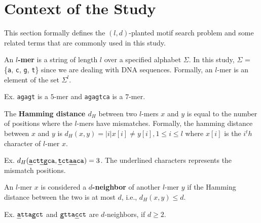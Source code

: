 \section{Context of the Study}

This section formally defines the $(l, d)$-planted motif search problem and some related terms that are commonly used in this study. \newline

 \newline
\noindent An \textbf{\boldmath $l$-mer} is a string of length $l$ over a specified alphabet $\Sigma$. In this study, $\Sigma$ = \{\texttt{a}, \texttt{c}, \texttt{g}, \texttt{t}\} since we are dealing with DNA sequences. Formally, an $l$-mer is an element of the set $\Sigma^l$. 

\noindent \hspace*{35pt} Ex. \texttt{agagt} is a $5$-mer and \texttt{agagtca} is a $7$-mer.  \newline

 \newline
\noindent The \textbf{\boldmath Hamming distance $d_H$} between two $l$-mers $x$ and $y$ is equal to the number of positions where the $l$-mers have mismatches. Formally, the hamming distance between $x$ and $y$ is $d_H(x, y) = |{i | x[i] \neq y[i], 1 \leq i \leq l}$ where $x[i]$ is the $i^th$ character of $l$-mer $x$.

\noindent \hspace*{35pt} Ex. $d_H(\texttt{\uline{a}ct\uline{tg}ca}, \texttt{\uline{t}ct\uline{aa}ca}) = 3$.\newline
\noindent \hspace*{55pt} The underlined characters represents the mismatch positions. \newline

 \newline
\noindent An $l$-mer $x$ is considered a \textbf{\boldmath $d$-neighbor} of another $l$-mer $y$ if the Hamming distance between the two is at most $d$, i.e., $d_H(x, y) \leq d$.

\noindent \hspace*{35pt} Ex. $\texttt{\uline{a}tta\uline{g}ct}$ and $\texttt{\uline{g}tta\uline{c}ct}$ are $d$-neighbors, \newline
\noindent \hspace*{55pt} if $d \geq 2$. \newline

